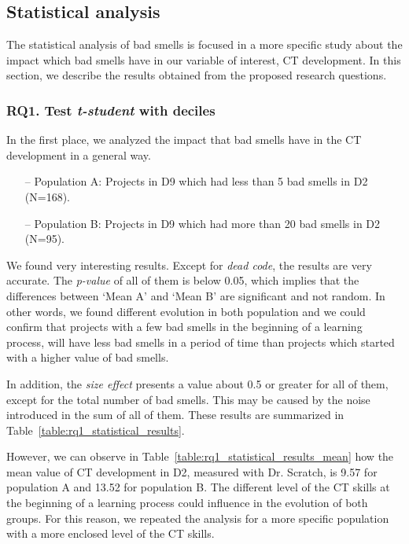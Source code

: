 \subsection{Statistical analysis}
\label{subsec:results_statistical}

The statistical analysis of bad smells is focused in a more specific study about the impact which bad smells have in our variable of interest, CT development. In this section, we describe the results obtained from the proposed research questions. 

\subsubsection{RQ1. Test \textit{t-student} with deciles}
\label{subsubsec:rq1_statistical_results}

In the first place, we analyzed the impact that bad smells have in the CT development in a general way.

\begin{itemize}
    \item[--] Population A: Projects in D9 which had less than 5 bad smells in D2 (N=168).
    \item[--] Population B: Projects in D9 which had more than 20 bad smells in D2 (N=95).
\end{itemize}

We found very interesting results. Except for \textit{dead code}, the results are very accurate. The \textit{p-value} of all of them is below 0.05, which implies that the differences between `Mean A' and `Mean B' are significant and not random. In other words, we found different evolution in both population and we could confirm that projects with a few bad smells in the beginning of a learning process, will have less bad smells in a period of time than projects which started with a higher value of bad smells. 

In addition, the \textit{size effect} presents a value about 0.5 or greater for all of them, except for the total number of bad smells. This may be caused by the noise introduced in the sum of all of them. These results are summarized in Table~\ref{table:rq1_statistical_results}.

However, we can observe in Table~\ref{table:rq1_statistical_results_mean} how the mean value of CT development in D2, measured with Dr. Scratch, is 9.57 for population A and 13.52 for population B. The different level of the CT skills at the beginning of a learning process could influence in the evolution of both groups. For this reason, we repeated the analysis for a more specific population with a more enclosed level of the CT skills.


